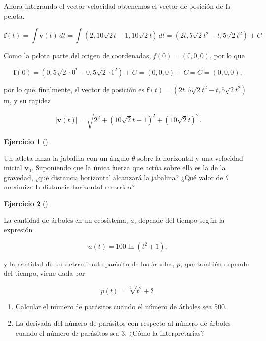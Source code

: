 \documentclass[
  a4paper,
]{scrreport}
\theoremstyle{definition}
\newtheorem{exercise}{Ejercicio}[chapter]
\theoremstyle{remark}
\begin{document}
\begin{tcolorbox}
Ahora integrando el vector velocidad obtenemos el vector de posición de
la pelota.

\[
\mathbf{f}(t)
= \int \mathbf{v}(t)\,dt 
= \int (2, 10\sqrt{2}t-1, 10\sqrt{2}t)\, dt 
= (2t, 5\sqrt{2}t^2-t, 5\sqrt{2}t^2) + C
\]

Como la pelota parte del origen de coordenadas, \(f(0)=(0,0,0)\), por lo
que

\[
\mathbf{f}(0) 
= (0, 5\sqrt{2}\cdot 0^2-0, 5\sqrt{2}\cdot 0^2) + C 
= (0, 0, 0) + C 
= C 
= (0, 0, 0), 
\]

por lo que, finalmente, el vector de posición es
\(\mathbf{f}(t)=(2t, 5\sqrt{2}t^2-t, 5\sqrt{2}t^2)\) m, y su rapidez

\[
|\mathbf{v}(t)| 
= \sqrt{2^2 + (10\sqrt{2}t-1)^2 + (10\sqrt{2}t)^2}.
\]

\end{tcolorbox}

\begin{exercise}[]\protect\hypertarget{exr-cinematica-jabalina}{}\label{exr-cinematica-jabalina}

Un atleta lanza la jabalina con un ángulo \(\theta\) sobre la horizontal
y una velocidad inicial \(\mathbf{v}_0\). Suponiendo que la única fuerza
que actúa sobre ella es la de la gravedad, ¿qué distancia horizontal
alcanzará la jabalina? ¿Qué valor de \(\theta\) maximiza la distancia
horizontal recorrida?

\end{exercise}

\begin{exercise}[]\protect\hypertarget{exr-parasitos}{}\label{exr-parasitos}

La cantidad de árboles en un ecosistema, \(a\), depende del tiempo según
la expresión

\[
a(t)=100\ln(t^2+1),
\]

y la cantidad de un determinado parásito de los árboles, \(p\), que
también depende del tiempo, viene dada por

\[
p(t) = \sqrt[3]{{t^2  + 2}}.
\]

\begin{enumerate}
\def\labelenumi{\alph{enumi}.}
\item
  Calcular el número de parásitos cuando el número de árboles sea 500.
\item
  La derivada del número de parásitos con respecto al número de árboles
  cuando el número de parásitos sea 3. ¿Cómo la interpretarías?
\end{enumerate}

\end{exercise}
\end{document}
